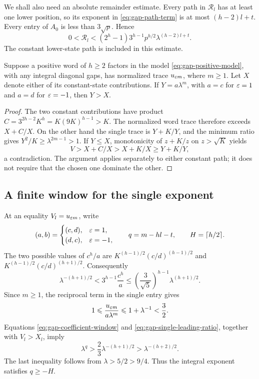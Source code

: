 We shall also need an absolute remainder estimate. Every path in
$\mathcal R_l$ has at least one lower position, so its exponent in
\eqref{eq:gap-path-term} is at most $(h-2)l+t$. Every entry of $A_0$
is less than $3\sqrt p$. Hence
\begin{equation}\label{eq:gap-absolute-remainder}
 0<\mathcal R_l<(2^h-1)3^{h-1}p^{h/2}
 \lambda^{(h-2)l+t}.
\end{equation}
The constant lower-state path is included in this estimate.

\begin{lemma}
\label{lem:positive-discrepancy}
Suppose a positive word of $h\geqslant2$ factors in the model
\eqref{eq:gap-positive-model}, with any integral diagonal gaps, has
normalized trace $u_{\varepsilon m}$, where $m\geqslant1$. Let $X$ denote
either of its constant-state contributions. If
$Y=a\lambda^m$, with $a=c$ for $\varepsilon=1$ and $a=d$ for $\varepsilon=-1$,
then $Y>X$.
\end{lemma}

\begin{proof}
The two constant contributions have product
$C=3^{2h-2}K^h=K(9K)^{h-1}>K$. The normalized word trace therefore
exceeds $X+C/X$. On the other hand the single trace is $Y+K/Y$, and
the minimum ratio gives $Y^2/K\geqslant\lambda^{2m-1}>1$.
If $Y\leqslant X$, monotonicity of $z+K/z$ on $z>\sqrt K$ yields
$$
 V>X+C/X>X+K/X\geqslant Y+K/Y,
$$
a contradiction. The argument applies separately to either constant
path; it does not require that the chosen one dominate the other.
\end{proof}

\subsection{A finite window for the single exponent}

At an equality $V_l=u_{\varepsilon m}$, write
$$
 (a,b)=\begin{cases}(c,d),&\varepsilon=1,\\(d,c),&\varepsilon=-1,
 \end{cases}
 \qquad q=m-hl-t,\qquad H=\lceil h/2\rceil.
$$
The two possible values of $c^h/a$ are
$K^{(h-1)/2}(c/d)^{(h-1)/2}$ and
$K^{(h-1)/2}(c/d)^{(h+1)/2}$. Consequently
\begin{equation}\label{eq:gap-coefficient-window}
 \lambda^{-(h+1)/2}
 <3^{h-1}\frac{c^h}{a}
 \leqslant\left(\frac3{\sqrt5}\right)^{h-1}
 \lambda^{(h+1)/2}.
\end{equation}
Since $m\geqslant1$, the reciprocal term in the single entry gives
\begin{equation}\label{eq:gap-single-leading-ratio}
 1\leqslant\frac{u_{\varepsilon m}}{a\lambda^m}
 \leqslant1+\lambda^{-1}<\frac32.
\end{equation}
Equations \eqref{eq:gap-coefficient-window} and
\eqref{eq:gap-single-leading-ratio}, together with $V_l>X_l$, imply
$$
 \lambda^q>\frac23\lambda^{-(h+1)/2}
 >\lambda^{-(h+2)/2}.
$$
The last inequality follows from $\lambda>5/2>9/4$. Thus the integral
exponent satisfies $q\geqslant-H$.


